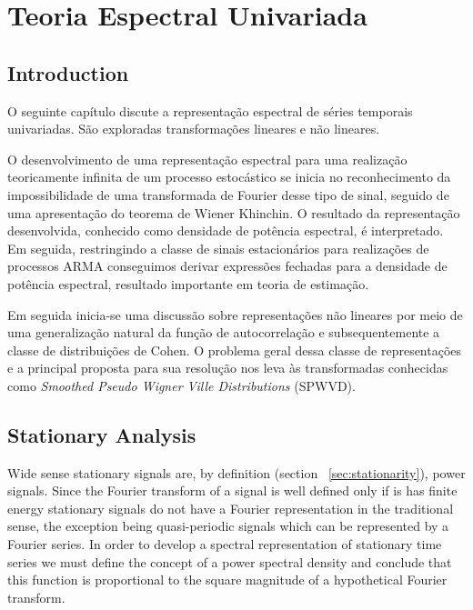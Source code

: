 \chapter{Teoria Espectral Univariada}\label{chap:spectral_analysis}

\section*{Introduction}

O seguinte capítulo discute a representação espectral de séries temporais
univariadas. São exploradas transformações lineares e não lineares.

O desenvolvimento de uma representação espectral para uma realização
teoricamente infinita de um processo estocástico se inicia no reconhecimento da
impossibilidade de uma transformada de Fourier desse tipo de sinal, seguido de
uma apresentação do teorema de Wiener Khinchin. O resultado da representação
desenvolvida, conhecido como densidade de potência espectral, é interpretado.
Em seguida, restringindo a classe de sinais estacionários para realizações de
processos ARMA conseguimos derivar expressões fechadas para a densidade
de potência espectral, resultado importante em teoria de
estimação\cite{estimation_theory}.

Em seguida inicia-se uma discussão sobre representações não lineares por meio
de uma generalização natural da função de autocorrelação e subsequentemente a
classe de distribuições de Cohen. O problema geral dessa classe de
representações e a principal proposta para sua resolução nos leva às
transformadas conhecidas como \emph{Smoothed Pseudo Wigner Ville
Distributions} (SPWVD).

\section{Stationary Analysis}

Wide sense stationary signals are, by definition (section
~\ref{sec:stationarity}), power signals. Since the Fourier transform of a
signal is well defined only if is has finite energy stationary signals do not
have a Fourier representation in the traditional sense, the exception being
quasi-periodic signals which can be represented by a Fourier series. In order
to develop a spectral representation of stationary time series we must define
the concept of a power spectral density and conclude that this function is
proportional to the square magnitude of a hypothetical Fourier transform.

